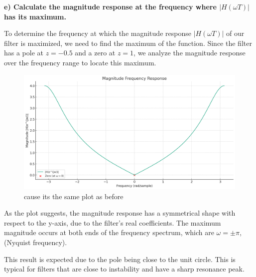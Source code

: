\documentclass{article}
\begin{document}
\textbf{e) Calculate the magnitude response at the frequency where \(|H(\omega T)|\) has its maximum.}

To determine the frequency at which the magnitude response $|H(\omega T)|$ of our filter is maximized, we need to find the maximum of the function. Since the filter has a pole at $z = -0.5$ and a zero at $z = 1$, we analyze the magnitude response over the frequency range to locate this maximum.
\begin{figure}[H]
    \centering
    \includegraphics[width=1\textwidth]{image1.png}
    \caption{cause its the same plot as before}
    \label{fig:example}
\end{figure}    
As the plot suggests, the magnitude response has a symmetrical shape with respect to the y-axis, due to the filter's real coefficients. The maximum magnitude occurs at both ends of the frequency spectrum, which are $\omega = \pm\pi$, (Nyquist frequency).

This result is expected due to the pole being close to the unit circle. This is typical for filters that are close to instability and have a sharp resonance peak.
\end{document}
